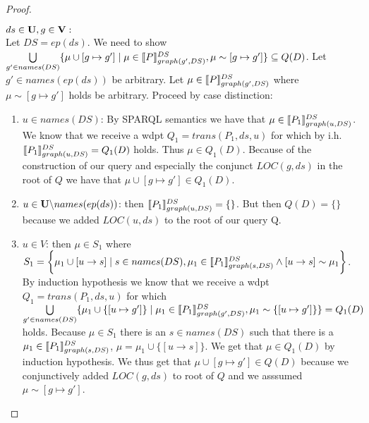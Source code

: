 \begin{proof}
\begin{enumerate}
			\bigskip\noindent
			$ds \in \mathbf{U}, g \in \mathbf{V}:$ \\ Let $DS = ep(ds)$.
			We need to show 
			$\bigcup\limits_{g' \in names(DS)} \{ \mu \cup [g\mapsto g'] \mid \mu \in
				\llbracket P \rrbracket^{DS}_{graph(g',DS)}, \mu \sim
			[g\mapsto g'] \}  \subseteq Q(D) $.
			Let  $g' \in names(ep(ds))$ be arbitrary.
			Let $\mu \in \llbracket P \rrbracket^{DS}_{graph(g',DS)}$ where $\mu \sim [g
			\mapsto g']$ holds be arbitrary.
			Proceed by case distinction:
			\begin{enumerate}
				\item $u \in names(DS)$:
					By SPARQL semantics we have that $\mu \in \llbracket P_1
					\rrbracket^{DS}_{graph(u,DS)}$.
					We know that we receive a wdpt $Q_1	= trans(P_1,ds,u)$ 
					for which by i.h.
					$\llbracket P_1 \rrbracket^{DS}_{graph(u,DS)} = Q_1(D)$ holds. Thus $\mu
					\in Q_1(D)$.
					Because of the construction of our query and especially the
					conjunct $LOC(g,ds)$ in the root of $Q$ we have that 
					$\mu \cup [g\mapsto g'] \in Q_1(D)$.

				\item $u \in \mathbf{U} \backslash names(ep(ds))$:
					then $\llbracket P_1 \rrbracket^{DS}_{graph(u,DS)} = \{\}$. But then
					$Q(D) = \{\}$ because we added $LOC(u,ds)$ to the root of
					our query Q.
				\item $u \in V$:
					then $\mu \in S_1$ where $S_1 =  \bigg\{\mu_1 \cup [ u \rightarrow s ] \mid
						s \in names(DS), \mu_1 \in \llbracket P_1
						\rrbracket^{DS}_{graph(s,DS)} \land [ u \rightarrow s ] \sim
					\mu_1 \bigg\}$. 
					By induction hypothesis we know that we receive a wdpt $Q_1
					= trans(P_1,ds,u)$ for which\\ $\bigcup\limits_{g'\in names(DS)} 
					\{ \mu_1 \cup \{[u\mapsto g']\} \mid 
						\mu_1 \in \llbracket P_1 \rrbracket^{DS}_{graph(g',DS)}, 
					\mu_1 \sim \{[u \mapsto g']\}\} = Q_1(D)$ holds. Because $\mu \in S_1$ there
					is an $s \in names(DS)$ such  that there is a $\mu_1 \in \llbracket P_1
					\rrbracket^{DS}_{graph(s,DS)}$, 
					$\mu = \mu_1 \cup \{[u \rightarrow s]\}$. 
					We get that $\mu \in Q_1(D)$ by induction hypothesis. 
					We thus get that $\mu\cup[g\mapsto g'] \in Q(D)$ because we
					conjunctively added $LOC(g,ds)$ to root of $Q$ and we
					asssumed $\mu \sim [g\mapsto g']$.
			\end{enumerate}


\end{enumerate}
\end{proof}
